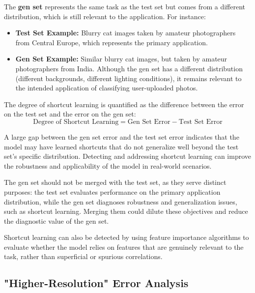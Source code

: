 \documentclass[12pt,openany]{book}
\begin{document}
The \textbf{gen set} represents the same task as the test set but comes from a different distribution, which is still relevant to the application. For instance:
\begin{itemize}
    \item \textbf{Test Set Example:} Blurry cat images taken by amateur photographers from Central Europe, which represents the primary application.
    \item \textbf{Gen Set Example:} Similar blurry cat images, but taken by amateur photographers from India. Although the gen set has a different distribution (different backgrounds, different lighting conditions), it remains relevant to the intended application of classifying user-uploaded photos.
\end{itemize}

The degree of shortcut learning is quantified as the difference between the error on the test set and the error on the gen set:
\[
\text{Degree of Shortcut Learning} = \text{Gen Set Error} - \text{Test Set Error}
\]

A large gap between the gen set error and the test set error indicates that the model may have learned shortcuts that do not generalize well beyond the test set's specific distribution. Detecting and addressing shortcut learning can improve the robustness and applicability of the model in real-world scenarios. \newline

\begin{notebox}
The gen set should not be merged with the test set, as they serve distinct purposes: the test set evaluates performance on the primary application distribution, while the gen set diagnoses robustness and generalization issues, such as shortcut learning. Merging them could dilute these objectives and reduce the diagnostic value of the gen set.
\end{notebox}

\begin{notebox}
Shortcut learning can also be detected by using feature importance algorithms to evaluate whether the model relies on features that are genuinely relevant to the task, rather than superficial or spurious correlations.
\end{notebox}


\subsection{"Higher-Resolution" Error Analysis}
\end{document}
